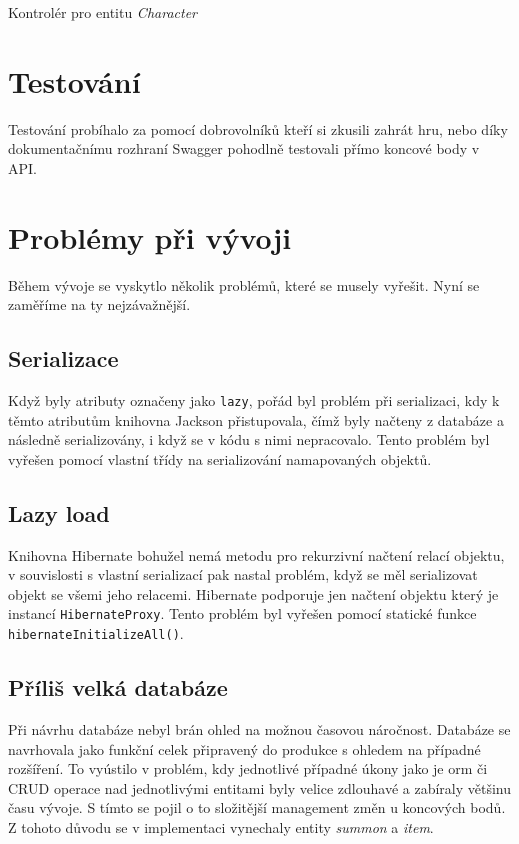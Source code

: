 \begin{listing}[ht!]
    \inputminted[]{Java}{resources/code/impl/CharacterController.java}
    \caption{Kontrolér pro entitu \textit{Character}}
    \label{code:characterController}
\end{listing}


\section{Testování}\label{sec:testing}
Testování probíhalo za pomocí dobrovolníků kteří si zkusili zahrát hru, nebo díky dokumentačnímu rozhraní Swagger  pohodlně testovali přímo koncové body v API.



\section{Problémy při vývoji}
Během vývoje se vyskytlo několik problémů, které se musely vyřešit. Nyní se zaměříme na ty nejzávažnější.

\subsection{Serializace} %
Když byly atributy označeny jako \texttt{lazy}, pořád byl problém při serializaci, kdy k těmto atributům knihovna Jackson přistupovala, čímž byly načteny z databáze a následně serializovány, i když se v kódu s nimi nepracovalo. Tento problém byl vyřešen pomocí vlastní třídy 
na serializování namapovaných objektů. 

\subsection{Lazy load}
Knihovna Hibernate bohužel nemá metodu pro rekurzivní načtení relací objektu, v souvislosti s vlastní serializací pak nastal problém, když se měl serializovat objekt se všemi jeho relacemi. Hibernate podporuje jen načtení objektu který je instancí \texttt{HibernateProxy}. Tento problém byl vyřešen pomocí statické funkce \texttt{hibernateInitializeAll()}. 

\subsection{Příliš velká databáze}
Při návrhu databáze nebyl brán ohled na možnou časovou náročnost. Databáze se navrhovala jako funkční celek připravený do produkce s ohledem na případné rozšíření. To vyústilo v problém, kdy jednotlivé případné úkony jako je \gls{orm} či CRUD operace nad jednotlivými entitami byly velice zdlouhavé a zabíraly většinu času vývoje. S tímto se pojil o to složitější management změn u koncových bodů. Z tohoto důvodu se v implementaci vynechaly entity \textit{summon} a \textit{item}.
